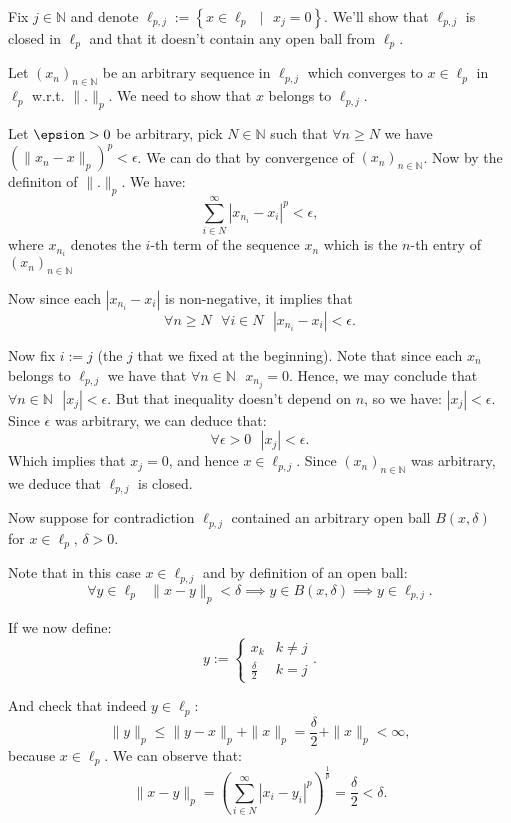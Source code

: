 \documentclass[11pt]{article}
\newcommand\lb{\left\lbrace}
\newcommand\rb{\right\rbrace}
\newcommand\st{\text{ } | \text{ }}
\newcommand\N{\mathbb{N}}
\begin{document}
Fix $j \in \N$ and denote $\ell_{p, j} := \lb x \in \ell_p \st x_j = 0 \rb$.
We'll show that $\ell_{p, j}$ is closed in $\ell_p$ and that it doesn't contain
any open ball from $\ell_p$.

Let $(x_n)_{n \in \mathbb{N}}$ be an arbitrary sequence in $\ell_{p, j}$ which
converges to $x \in \ell_p $ in $\ell_p$ w.r.t.  $ \|.\|_p$. We need to show
that $x$ belongs to $\ell_{p, j}$.

Let $\epsion > 0$ be arbitrary, pick $N \in \N$ such that $\forall n \ge N$ we
have $\left(\|x_n - x\|_p\right)^p < \epsilon$. We can do that by convergence of
$(x_n)_{n \in \mathbb{N}}$. Now by the definiton of $ \|.\|_p$. We have:
\[
\sum_{i \in N}^\infty |x_{n_i} - x_i|^p < \epsilon
,\]
where $x_{n_i}$ denotes the $i$-th term of the sequence $x_n$ which is the
 $n$-th entry of  $(x_n)_{n \in \mathbb{N}}$

Now since each $|x_{n_i} - x_i|$ is non-negative, it implies that
\[
  \forall n \ge N \text{ } \forall i \in N \text{ } |x_{n_i} - x_i| < \epsilon
.\]

Now fix $i := j$ (the $j$ that we fixed at the beginning). Note that since each
$x_n$ belongs to $\ell_{p, j}$ we have that $\forall n \in \N \text{ } x_{n_j} = 0 $.
Hence, we may conclude that $\forall n \in \N \text{ } |x_j| < \epsilon$. But that
inequality doesn't depend on $n$, so we have: $|x_j| < \epsilon$. Since $\epsilon$
was arbitrary, we can deduce that:
 \[
   \forall \epsilon > 0 \text{ } |x_j| < \epsilon
.\]
Which implies that $x_j = 0$, and hence $x \in \ell_{p, j}$. Since $(x_n)_{n \in \mathbb{N}}$
was arbitrary, we deduce that $\ell_{p, j}$ is closed.

Now suppose for contradiction $\ell_{p, j}$ contained an arbitrary open ball $B(x, \delta)$
for  $x \in \ell_{p} \text{, } \delta > 0$.

Note that in this case $x \in \ell_{p, j}$ and by definition of an open ball:
\[
\forall y \in \ell_p \text{ } \|x - y \|_p < \delta \implies y \in B(x, \delta) \implies y \in \ell_{p, j}
.\]

If we now define:
\[
y := \begin{cases}
  x_k & k \neq j \\
  \frac{\delta}{2} & k = j
\end{cases}
.\]

And check that indeed $y \in \ell_p$:
\[
\|y\|_p \le \|y - x\|_p + \|x\|_p = \frac{\delta}{2} + \|x\|_p < \infty
,\]
because $x \in \ell_p$. We can observe that:
\[
\|x - y\|_p = \left(\sum_{i \in N}^\infty |x_i - y_i|^p\right)^\frac{1}{p} = \frac{\delta}{2} < \delta
.\]
\end{document}
